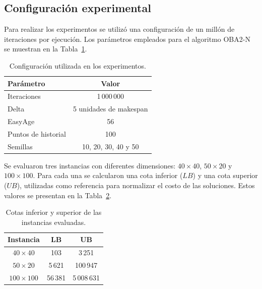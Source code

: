 \documentclass[12pt,a4paper]{article}
\begin{document}
\subsection{Configuración experimental}
\label{subsec:configuracion-experimental}

Para realizar los experimentos se utilizó una configuración de un millón de iteraciones por ejecución. Los parámetros empleados para el algoritmo OBA2-N se muestran en la Tabla~\ref{tab:configuracion-experimental}.

\begin{table}[H]
    \centering
    \caption{Configuración utilizada en los experimentos.}
    \label{tab:configuracion-experimental}
    \begin{tabular}{lc}
        \hline
        \textbf{Parámetro} & \textbf{Valor} \\
        \hline
        Iteraciones & 1\,000\,000 \\
        Delta & 5 unidades de makespan \\
        EasyAge & 56 \\
        Puntos de historial & 100 \\
        Semillas & 10, 20, 30, 40 y 50 \\
        \hline
    \end{tabular}
\end{table}

Se evaluaron tres instancias con diferentes dimensiones: $40 \times 40$, $50 \times 20$ y $100 \times 100$. Para cada una se calcularon una cota inferior ($LB$) y una cota superior ($UB$), utilizadas como referencia para normalizar el costo de las soluciones. Estos valores se presentan en la Tabla~\ref{tab:cotas-instancias}.

\begin{table}[H]
    \centering
    \caption{Cotas inferior y superior de las instancias evaluadas.}
    \label{tab:cotas-instancias}
    \begin{tabular}{ccc}
        \hline
        \textbf{Instancia} & \textbf{LB} & \textbf{UB} \\
        \hline
        $40 \times 40$   & 103    & 3\,251 \\
        $50 \times 20$   & 5\,621  & 100\,947 \\
        $100 \times 100$ & 56\,381 & 5\,008\,631 \\
        \hline
    \end{tabular}
\end{table}
\end{document}
